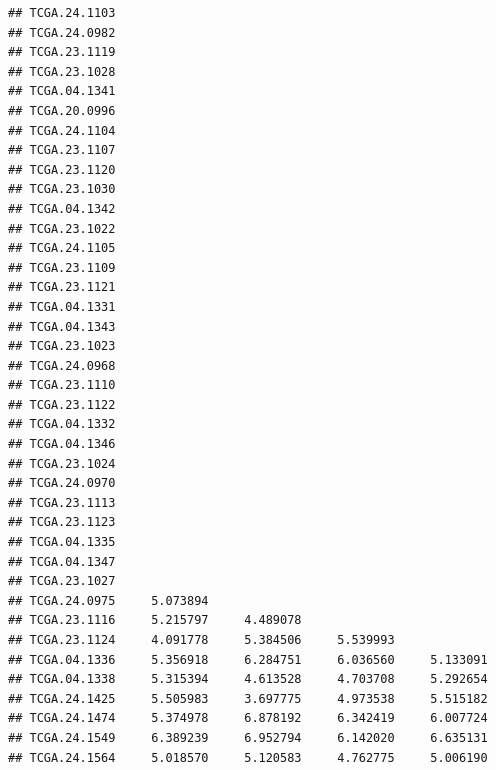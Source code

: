 \documentclass[UTF8]{beamer}\usepackage[]{graphicx}\usepackage[]{color}
\makeatletter
\newenvironment{kframe}{%
 \def\at@end@of@kframe{}%
 \ifinner\ifhmode%
  \def\at@end@of@kframe{\end{minipage}}%
  \begin{minipage}{\columnwidth}%
 \fi\fi%
 \def\FrameCommand##1{\hskip\@totalleftmargin \hskip-\fboxsep
 \colorbox{shadecolor}{##1}\hskip-\fboxsep
     \hskip-\linewidth \hskip-\@totalleftmargin \hskip\columnwidth}%
 \MakeFramed {\advance\hsize-\width
   \@totalleftmargin\z@ \linewidth\hsize
   \@setminipage}}%
 {\par\unskip\endMakeFramed%
 \at@end@of@kframe}
\newenvironment{knitrout}{}{} %
\makeatother
\begin{document}
\begin{frame}[fragile]
\begin{knitrout}
\begin{kframe}
\begin{verbatim}
## TCGA.24.1103                                                    
## TCGA.24.0982                                                    
## TCGA.23.1119                                                    
## TCGA.23.1028                                                    
## TCGA.04.1341                                                    
## TCGA.20.0996                                                    
## TCGA.24.1104                                                    
## TCGA.23.1107                                                    
## TCGA.23.1120                                                    
## TCGA.23.1030                                                    
## TCGA.04.1342                                                    
## TCGA.23.1022                                                    
## TCGA.24.1105                                                    
## TCGA.23.1109                                                    
## TCGA.23.1121                                                    
## TCGA.04.1331                                                    
## TCGA.04.1343                                                    
## TCGA.23.1023                                                    
## TCGA.24.0968                                                    
## TCGA.23.1110                                                    
## TCGA.23.1122                                                    
## TCGA.04.1332                                                    
## TCGA.04.1346                                                    
## TCGA.23.1024                                                    
## TCGA.24.0970                                                    
## TCGA.23.1113                                                    
## TCGA.23.1123                                                    
## TCGA.04.1335                                                    
## TCGA.04.1347                                                    
## TCGA.23.1027                                                    
## TCGA.24.0975     5.073894                                       
## TCGA.23.1116     5.215797     4.489078                          
## TCGA.23.1124     4.091778     5.384506     5.539993             
## TCGA.04.1336     5.356918     6.284751     6.036560     5.133091
## TCGA.04.1338     5.315394     4.613528     4.703708     5.292654
## TCGA.24.1425     5.505983     3.697775     4.973538     5.515182
## TCGA.24.1474     5.374978     6.878192     6.342419     6.007724
## TCGA.24.1549     6.389239     6.952794     6.142020     6.635131
## TCGA.24.1564     5.018570     5.120583     4.762775     5.006190

\end{verbatim}
\end{kframe}
\end{knitrout}
\end{frame}
\end{document}
